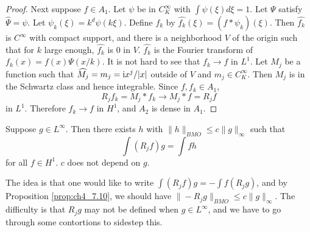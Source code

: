 \begin{proof}
Next suppose $f \in A_1$. Let $\psi$ be in $C_K^\infty$ with $\int \psi(\xi)d\xi = 1$. Let $\Psi$ satisfy $\widehat{\Psi}=\psi$. Let $\psi_k(\xi)=k^d\psi(k\xi)$. Define $f_k$ by $\widehat{f_k}(\xi) = (\widehat{f} * \psi_k)(\xi)$. Then $\widehat{f_k}$ is $C^\infty$ with compact support, and there is a neighborhood $V$ of the origin such that for $k$ large enough, $\widehat{f_k}$ is $0$ in $V$. $\widehat{f_k}$ is the Fourier transform of $f_k(x) = f(x)\Psi(x/k)$. It is not hard to see that $f_k \to f$ in $L^1$. Let $M_j$ be a function such that $\widehat{M_j} = m_j = \mathrm{i} x^j/|x|$ outside of $V$ and $m_j \in C_K^\infty$. Then $M_j$ is in the Schwartz class and hence integrable. Since $f,f_k \in A_1$,
\[
    R_jf_k = M_j * f_k \to M_j * f = R_jf
\]
in $L^1$. Therefore $f_k \to f$ in $H^1$, and $A_2$ is dense in $A_1$.
\end{proof}

\begin{proposition}\label{prop:ch4_7.14}
Suppose $g \in L^\infty$. Then there exists $h$ with $\|h\|_{BMO} \leq c\|g\|_\infty$ such that
\[
    \int (R_jf)g = \int fh
\]
for all $f \in H^1$. $c$ does not depend on $g$.
\end{proposition}

The idea is that one would like to write $\int(R_jf)g = -\int f(R_jg)$, and by Proposition \ref{prop:ch4_7.10}, we should have $\|-R_jg\|_{BMO} \leq c\|g\|_\infty$. The difficulty is that $R_jg$ may not be defined when $g \in L^\infty$, and we have to go through some contortions to sidestep this.

